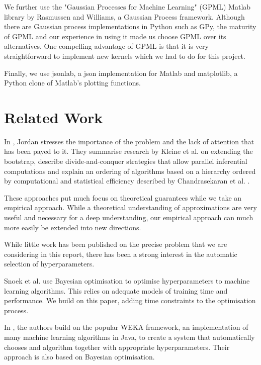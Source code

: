 \documentclass[a4paper,12pt,twoside,openright]{report}
\begin{document}
We further use the "Gaussian Processes for Machine Learning" (GPML) Matlab library by Rasmussen and Williams, a Gaussian Process framework. Although there are Gaussian process implementations in Python such as GPy, the maturity of GPML and our experience in using it made us choose GPML over its alternatives. One compelling advantage of GPML is that it is very straightforward to implement new kernels which we had to do for this project.

Finally, we use jsonlab, a json implementation for Matlab and matplotlib, a Python clone of Matlab's plotting functions.



\chapter{Related Work}
In \cite{jordan2013}, Jordan stresses the importance of the problem and the lack of attention that has been payed to it. They summarise research by Kleine et al. \cite{RSSB:RSSB12050} on extending the bootstrap, describe divide-and-conquer strategies that allow parallel inferential computations and explain an ordering of algorithms based on a hierarchy ordered by computational and statistical efficiency described by Chandrasekaran et al. \cite{Chandrasekaran26032013}.

These approaches put much focus on theoretical guarantees while we take an empirical approach. While a theoretical understanding of approximations are very useful and necessary for a deep understanding, our empirical approach can much more easily be extended into new directions.


While little work has been published on the precise problem that we are considering in this report, there has been a strong interest in the automatic selection of hyperparameters.

Snoek et al. \cite{PracticalBayesianOptimization} use Bayesian optimisation to optimise hyperparameters to machine learning algorithms. This relies on adequate models of training time and performance. We build on this paper, adding time constraints to the optimisation process.


In \cite{ThoHutHooLey13-AutoWEKA}, the authors build on the popular WEKA framework, an implementation of many machine learning algorithms in Java, to create a system that automatically chooses and algorithm together with appropriate hyperparameters. Their approach is also based on Bayesian optimisation.
\end{document}
